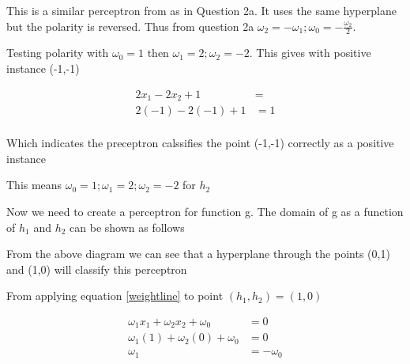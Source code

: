 \documentclass[10pt,a4paper]{article}
\begin{document}
This is a similar perceptron from as in Question 2a. It uses the same hyperplane but the polarity is reversed. Thus from question 2a $\omega_2 = -\omega_1; \omega_0 = -\frac{\omega_2}{2}$. 

Testing polarity with $\omega_0 = 1$ then $\omega_1=2;\omega_2=-2$. This gives with positive instance (-1,-1)

\begin{equation}
\begin{split}
2x_1 - 2x_2 +1 &= \\
2(-1) - 2(-1) +1 &= 1 \\
\end{split}
\end{equation}  

Which indicates the preceptron calssifies the point (-1,-1) correctly as a positive instance

This means $\omega_0 = 1;\omega_1=2;\omega_2=-2$ for $h_2$


Now we need to create a perceptron for function g. The domain of g as a function of $h_1$ and $h_2$ can be shown as follows

\begin{center}
\end{center}

From the above diagram we can see that a hyperplane through the points (0,1) and (1,0) will classify this perceptron

From applying equation \ref{weightline} to point $(h_1,h_2) = (1,0)$

\begin{equation}
\label{2bc1}
\begin{split}
\omega_1 x_1 + \omega_2 x_2 + \omega_0 &= 0 \\
\omega_1(1) + \omega_2(0) + \omega_0 &= 0 \\
\omega_1 &= -\omega_0\\
\end{split}
\end{equation}
\end{document}
